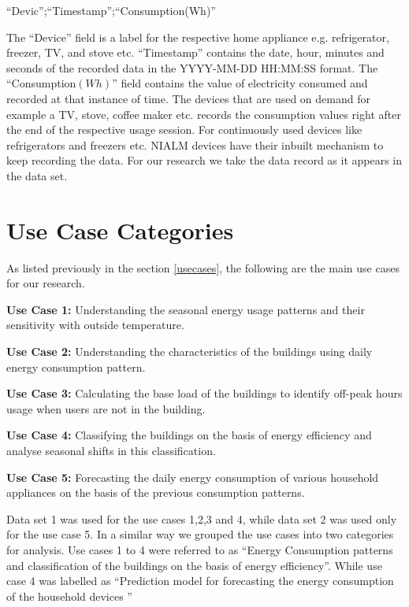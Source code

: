 ``Devic'';``Timestamp'';``Consumption(Wh)''

The ``Device'' field is a label for the respective home appliance e.g. refrigerator, freezer, TV, and stove etc. ``Timestamp'' contains the date, hour, minutes and seconds of the recorded data in the  YYYY-MM-DD HH:MM:SS format. The ``Consumption\((Wh)\)'' field contains the value of electricity consumed and recorded at that instance of time. The devices that are used on demand for example a TV, stove, coffee maker etc. records the consumption values right after the end of the respective usage session. For continuously used devices like refrigerators and freezers etc. NIALM devices have their inbuilt mechanism to keep recording the data. For our research we take the data record as it appears in the data set.   

\section{Use Case Categories}

As listed previously in the section \ref{usecases}, the following are the main use cases for our research.

\textbf{Use Case 1:} Understanding the seasonal energy usage patterns and their sensitivity with outside temperature.

\textbf{Use Case 2:} Understanding the characteristics of the buildings using daily energy consumption pattern.

\textbf{Use Case 3:} Calculating the base load of the buildings to identify off-peak hours usage when users are not in the building.

\textbf{Use Case 4:} Classifying the buildings on the basis of energy efficiency and analyse seasonal shifts in this classification.

\textbf{Use Case 5:} Forecasting the daily energy consumption of various household appliances on the basis of the previous consumption patterns.

Data set 1 was used for the use cases 1,2,3 and 4, while data set 2 was used only for the use case 5. In a similar way we grouped the use cases into two categories for analysis. Use cases 1 to 4 were referred to as ``Energy Consumption patterns and classification of the buildings on the basis of energy efficiency''. While use case 4 was labelled as ``Prediction model for forecasting  the energy consumption of the household devices ''


